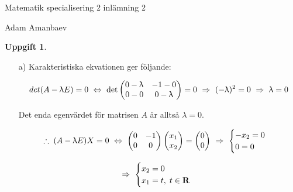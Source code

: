 \documentclass{article}
\newtheorem{thr}{Uppgift}
\begin{document}


\newpage

\centerline{\large Matematik specialisering 2 inlämning 2}

\vskip 0.1cm

\centerline{\scriptsize Adam Amanbaev}

\vskip 1cm

\begin{thr}
\end{thr}

\begin{enumerate}
    \item[a)] Karakteristiska ekvationen ger följande:

        $$
        det(A-\uplambda E)=0 
        \ \Leftrightarrow \  
        \det\begin{pmatrix}
            0-\uplambda & -1-0 \\
            0-0 & 0-\uplambda 
        \end{pmatrix}
        =0
        \ \Rightarrow \ 
        (-\uplambda)^2=0
        \ \Rightarrow \ 
        \uplambda=0
        $$

        \vskip 0.3cm

        Det enda egenvärdet för matrisen $A$ är alltså $\lambda=0$.

        $$
        \therefore \; (A-\uplambda E)X=0 
        \ \Leftrightarrow \ 
        \begin{pmatrix}
            0 & -1 \\
            0 & 0
        \end{pmatrix}
        \begin{pmatrix}
            x_{1} \\
            x_{2}
        \end{pmatrix}
        =
        \begin{pmatrix}
            0 \\
            0
        \end{pmatrix}
        \ \Rightarrow \ 
        \begin{cases}
            -x_{2}=0 \\
            0=0
        \end{cases}
        $$
        
        \vskip 0.3cm

        $$
        \ \Rightarrow \ 
        \begin{cases}
            x_{2}=0 \\
            x_{1}=t, \; t \in \mathbf{R}
        \end{cases}
        $$


\end{enumerate}
\end{document}
